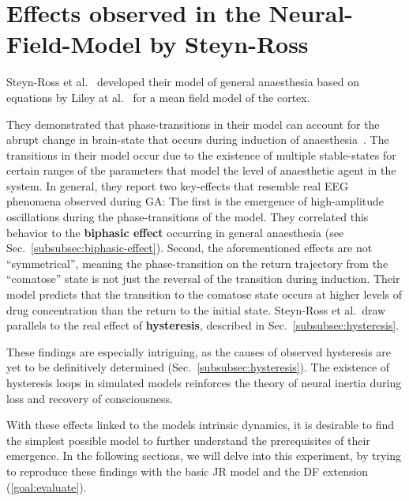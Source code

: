 \section{Effects observed in the Neural-Field-Model by Steyn-Ross}\label{sec:effects-observed-in-the-neural-field-model-by-steyn-ross}
Steyn-Ross et al.~\cite{steyn_ross_modelling_2004, steyn_ross_sleep_2005, hutt_progress_2011} developed their
model of general anaesthesia based on equations by Liley at al.~\cite{liley_continuum_1999} for a mean field model of the cortex.

They demonstrated that phase-transitions in their model can account for the abrupt change
in brain-state that occurs during induction of anaesthesia~\cite{steyn_ross_modelling_2004}.
The transitions in their model occur due to the existence of multiple stable-states for certain ranges of the
parameters that model the level of anaesthetic agent in the system.
In general, they report two key-effects that resemble real EEG phenomena observed during GA:
The first is the emergence of high-amplitude oscillations during the phase-transitions
of the model.
They correlated this behavior to the \textbf{biphasic effect} occurring in
general anaesthesia (see Sec.~\ref{subsubsec:biphasic-effect}).
Second, the aforementioned effects are not ``symmetrical'',
meaning the phase-transition on the return trajectory from the ``comatose'' state is not just the reversal of the transition
during induction.
Their model predicts that the transition to the comatose state occurs at higher levels of drug concentration than
the return to the initial state.
Steyn-Ross et al.\ draw parallels to the real effect of \textbf{hysteresis},
described in Sec.~\ref{subsubsec:hysteresis}.

These findings are especially intriguing,
as the causes of observed hysteresis are yet to be definitively determined (Sec.~\ref{subsubsec:hysteresis}).
The existence of hysteresis loops in simulated models reinforces the theory of neural inertia during loss and recovery
of consciousness.

With these effects linked to the models intrinsic dynamics,
it is desirable to find the simplest possible model to further understand the prerequisites of their emergence.
In the following sections, we will delve into this experiment,
by trying to reproduce these findings with the basic JR model and the DF extension (\ref{goal:evaluate}).